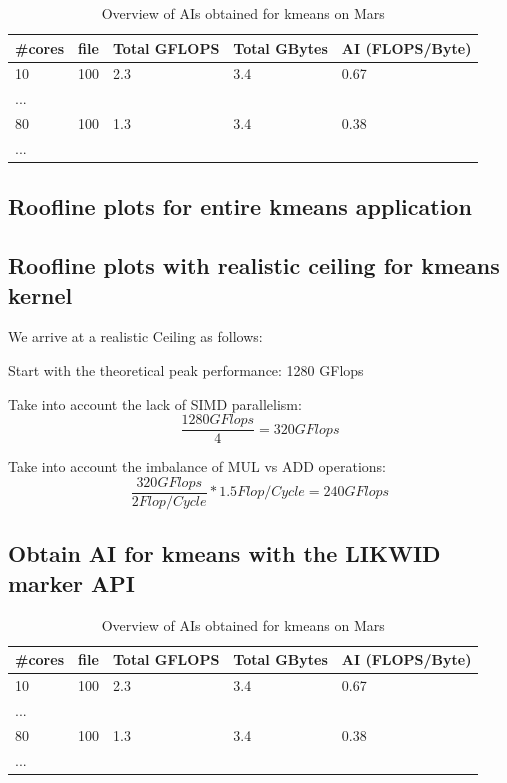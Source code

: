 \begin{table}[h]
\centering
\caption{\label{tab:ai_tab}Overview of AIs obtained for kmeans on Mars}
\begin{small}
\begin{tabular}{lllll}
\toprule
\#cores & file & Total GFLOPS & Total GBytes & AI (FLOPS/Byte) \\
\midrule
10 & 100 & 2.3 & 3.4 & 0.67 \\
...\\
80 & 100 & 1.3 & 3.4 & 0.38 \\
...\\
\bottomrule
\end{tabular}
\end{small}
\end{table}

\subsection{Roofline plots for entire kmeans application}

\subsection{Roofline plots with realistic ceiling for kmeans kernel}

We arrive at a realistic Ceiling as follows:

Start with the theoretical peak performance: 1280 GFlops

Take into account the lack of SIMD parallelism: 
$$\frac{1280 GFlops}{4} = 320 GFlops$$

Take into account the imbalance of MUL vs ADD operations:
$$\frac{320 GFlops}{2 Flop/Cycle} *1.5 Flop/Cycle = 240 GFlops$$

\subsection{Obtain AI for kmeans with the LIKWID marker API}

\begin{table}[h]
\centering
\caption{\label{tab:ai_tab}Overview of AIs obtained for kmeans on Mars}
\begin{small}
\begin{tabular}{lllll}
\toprule
\#cores & file & Total GFLOPS & Total GBytes & AI (FLOPS/Byte) \\
\midrule
10 & 100 & 2.3 & 3.4 & 0.67 \\
...\\
80 & 100 & 1.3 & 3.4 & 0.38 \\
...\\
\bottomrule
\end{tabular}
\end{small}
\end{table}

